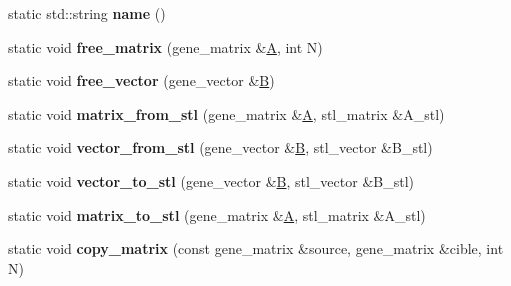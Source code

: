 \begin{DoxyCompactItemize}
\item 
\mbox{\label{classtiny__blitz__interface_a86440368a1d7bed97f319f1ccfff907a}} 
static std\+::string {\bfseries name} ()
\item 
\mbox{\label{classtiny__blitz__interface_a724baba4591ea90a26cec9538f542899}} 
static void {\bfseries free\+\_\+matrix} (gene\+\_\+matrix \&\hyperlink{group___core___module_class_eigen_1_1_matrix}{A}, int N)
\item 
\mbox{\label{classtiny__blitz__interface_a68372e7d8403541a21569159c0206ed0}} 
static void {\bfseries free\+\_\+vector} (gene\+\_\+vector \&\hyperlink{group___core___module_class_eigen_1_1_matrix}{B})
\item 
\mbox{\label{classtiny__blitz__interface_a30084b8eff48e072daac15fa1040e1f4}} 
static void {\bfseries matrix\+\_\+from\+\_\+stl} (gene\+\_\+matrix \&\hyperlink{group___core___module_class_eigen_1_1_matrix}{A}, stl\+\_\+matrix \&A\+\_\+stl)
\item 
\mbox{\label{classtiny__blitz__interface_a6707d134768a5efeec105f9a629e08ad}} 
static void {\bfseries vector\+\_\+from\+\_\+stl} (gene\+\_\+vector \&\hyperlink{group___core___module_class_eigen_1_1_matrix}{B}, stl\+\_\+vector \&B\+\_\+stl)
\item 
\mbox{\label{classtiny__blitz__interface_a8e5291a4089ac65bc2f85a63887cf01b}} 
static void {\bfseries vector\+\_\+to\+\_\+stl} (gene\+\_\+vector \&\hyperlink{group___core___module_class_eigen_1_1_matrix}{B}, stl\+\_\+vector \&B\+\_\+stl)
\item 
\mbox{\label{classtiny__blitz__interface_ac76e0cdc391a7393cf83ae53ae2b4967}} 
static void {\bfseries matrix\+\_\+to\+\_\+stl} (gene\+\_\+matrix \&\hyperlink{group___core___module_class_eigen_1_1_matrix}{A}, stl\+\_\+matrix \&A\+\_\+stl)
\item 
\mbox{\label{classtiny__blitz__interface_ad79c33f9a498bc78296d6d0b16666ed2}} 
static void {\bfseries copy\+\_\+matrix} (const gene\+\_\+matrix \&source, gene\+\_\+matrix \&cible, int N)

\end{DoxyCompactItemize}
